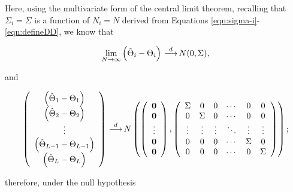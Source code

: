 \documentclass[useAMS]{cJAS2e}
\def\indist{\,{\buildrel d \over \longrightarrow}\,}
\begin{document}
\noindent Here, using the multivariate form of the central limit theorem, recalling that $\Sigma_i=\Sigma$ is a function of $N_i=N$ derived from Equations \eqref{eqn:sigma-i}-\eqref{eqn:defineDD}, we know that

\begin{equation}\label{eqn:case-i-central}
	\lim_{N \to \infty} \left(\hat{\Theta}_i - \Theta_i \right) \indist N(0,\Sigma) ,
\end{equation}


\noindent and

\begin{equation}\label{eqn:case-i-central-1}
	\left( \begin{array}{c}  \left(\hat{\Theta}_1 - \Theta_1 \right) \\   \left(\hat{\Theta}_2 - \Theta_2 \right) \\ \vdots \\  \left(\hat{\Theta}_{L-1} - \Theta_{L-1} \right) \\   \left(\hat{\Theta}_{L} - \Theta_{L} \right) \end{array} \right)  \indist N \left(\left( \begin{array}{c} \mathbf{0} \\ \mathbf{0} \\ \vdots \\ \mathbf{0} \\ \mathbf{0} \end{array} \right),\left( \begin{array}{cccccc} \Sigma & 0 & 0 & \cdots & 0 & 0 \\ 0 & \Sigma & 0 & \cdots & 0 & 0 \\ \vdots & \vdots & \vdots & \ddots & \vdots & \vdots \\ 0 & 0 & 0 & \cdots & \Sigma & 0 \\ 0 & 0 & 0 & \cdots & 0 & \Sigma   \end{array} \right) \right);
\end{equation}

\noindent therefore, under the null hypothesis
\end{document}

